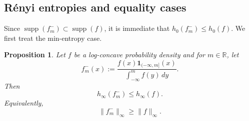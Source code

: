 \documentclass{article}
\theoremstyle{plain}
\newtheorem{proposition}[theorem]{Proposition}
\theoremstyle{definition}
\newcommand{\RL}{\mathbb{R}}
\newcommand{\1}{\mathbf 1}
\DeclareMathOperator{\supp}{supp}
\begin{document}

\subsection{Rényi entropies and equality cases} \label{renyisubsec}

Since $\supp(f_{m}^-)\subset \supp(f)$, it is immediate that $h_{0}(f_{m}^-)\leq h_{0}(f)$. We first treat the min-entropy case.
\begin{proposition}%
\label{min-entroy}
Let $f$ be a log-concave probability density and for $m \in \RL$, let 
\[
f_{m}^-(x):=\frac{f(x)\mathbf 1_{(-\infty,m]}(x)}{\int_{-\infty}^{m} f(y)\,dy}.
\]
Then
\[
h_{\infty}(f_m^-)\le h_{\infty}(f).
\]
Equivalently,
\[
\|f_m^-\|_\infty \ge \|f\|_\infty .
\]
\end{proposition}
\end{document}
